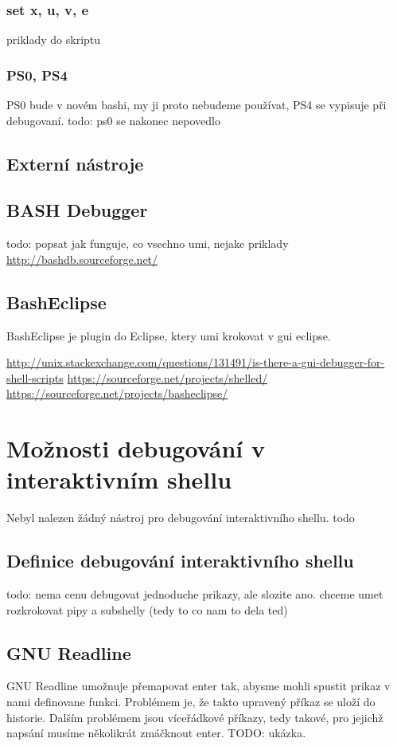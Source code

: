 \documentclass[thesis=M,czech]{FITthesis}[2012/06/26]
\begin{document}
\subsubsection{set x, u, v, e}
priklady do skriptu

\subsubsection{PS0, PS4}
PS0 bude v novém bashi, my ji proto nebudeme používat, PS4 se vypisuje při debugovaní.
todo: ps0 se nakonec nepovedlo

\subsection{Externí nástroje}

\subsection{BASH Debugger}
todo: popsat jak funguje, co vsechno umi, nejake priklady
\url{http://bashdb.sourceforge.net/}


\subsection{BashEclipse}
BashEclipse je plugin do Eclipse, ktery umi krokovat v gui eclipse.

\url{http://unix.stackexchange.com/questions/131491/is-there-a-gui-debugger-for-shell-scripts}
\url{https://sourceforge.net/projects/shelled/}
\url{https://sourceforge.net/projects/basheclipse/}

%
%
%
%
%
\section{Možnosti debugování v interaktivním shellu}

Nebyl nalezen žádný nástroj pro debugování interaktivního shellu. todo

\subsection{Definice debugování interaktivního shellu}
todo: nema cenu debugovat jednoduche prikazy, ale slozite ano. chceme umet rozkrokovat pipy a subshelly (tedy to co nam to dela ted)



\subsection{GNU Readline}
GNU Readline umožnuje přemapovat enter tak, abysme mohli spustit prikaz v nami definovane funkci. Problémem je, že takto upravený příkaz se uloží do historie. Dalším problémem jsou víceřádkové příkazy, tedy takové, pro jejichž napsání musíme několikrát zmáčknout enter.
TODO: ukázka.
\end{document}
